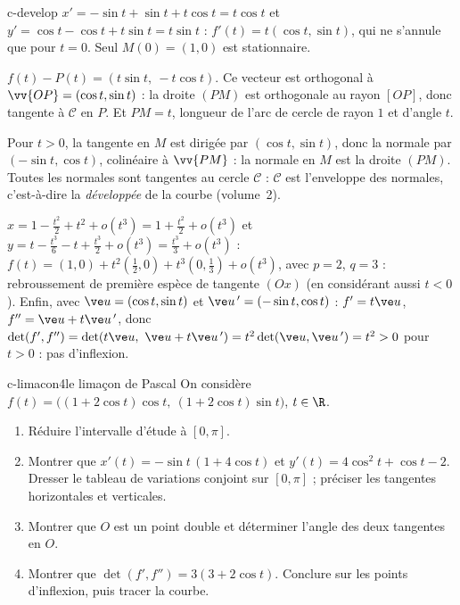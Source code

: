 \begin{corrige}{c-develop}
 $x'=-\sin t+\sin t+t\cos t=t\cos t$ et $y'=\cos t-\cos t+t\sin t=t\sin t$ : $f'(t)=t(\cos t,\sin t)$, qui ne s'annule que pour $t=0$. Seul $M(0)=(1,0)$ est stationnaire.

 $f(t)-P(t)=(t\sin t,\ -t\cos t)$. Ce vecteur est orthogonal à $\vv{OP}=(\cos t,\sin t)$ : la droite $(PM)$ est orthogonale au rayon $[OP]$, donc tangente à $\mathcal C$ en $P$. Et $PM=t$, longueur de l'arc de cercle de rayon $1$ et d'angle $t$.

 Pour $t>0$, la tangente en $M$ est dirigée par $(\cos t,\sin t)$, donc la normale par $(-\sin t,\cos t)$, colinéaire à $\vv{PM}$ : la normale en $M$ est la droite $(PM)$. Toutes les normales sont tangentes au cercle $\mathcal C$ : $\mathcal C$ est l'enveloppe des normales, c'est-à-dire la \emph{développée} de la courbe (volume~2).

 $x=1-\frac{t^2}2+t^2+o(t^3)=1+\frac{t^2}2+o(t^3)$ et $y=t-\frac{t^3}6-t+\frac{t^3}2+o(t^3)=\frac{t^3}3+o(t^3)$ : $f(t)=(1,0)+t^2\left(\tfrac12,0\right)+t^3\left(0,\tfrac13\right)+o(t^3)$, avec $p=2$, $q=3$ : rebroussement de première espèce de tangente $(Ox)$ (en considérant aussi $t<0$). Enfin, avec $\ve u=(\cos t,\sin t)$ et $\ve u\,'=(-\sin t,\cos t)$ : $f'=t\ve u$, $f''=\ve u+t\ve u\,'$, donc $\det(f',f'')=\det(t\ve u,\ \ve u+t\ve u\,')=t^2\det(\ve u,\ve u\,')=t^2>0$ pour $t>0$ : pas d'inflexion.
\end{corrige}

\begin{exo}{c-limacon}{4}{le limaçon de Pascal}
On considère $f(t)=\big((1+2\cos t)\cos t,\ (1+2\cos t)\sin t\big)$, $t\in\R$.
\begin{enumerate}
\item Réduire l'intervalle d'étude à $[0,\pi]$.
\item Montrer que $x'(t)=-\sin t\,(1+4\cos t)$ et $y'(t)=4\cos^2t+\cos t-2$. Dresser le tableau de variations conjoint sur $[0,\pi]$ ; préciser les tangentes horizontales et verticales.
\item Montrer que $O$ est un point double et déterminer l'angle des deux tangentes en $O$.
\item Montrer que $\det(f',f'')=3(3+2\cos t)$. Conclure sur les points d'inflexion, puis tracer la courbe.
\end{enumerate}
\end{exo}


